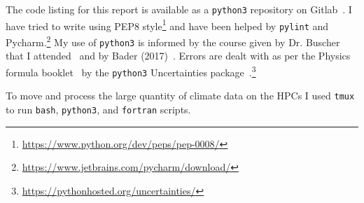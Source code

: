 \documentclass[../main.tex]{subfiles}
\begin{document}
The code listing for this report is available as a \texttt{python3} repository on Gitlab~\cite{gitlab}.
I have tried to write using PEP8 style\footnote{\href{https://www.python.org/dev/peps/pep-0008/}{https://www.python.org/dev/peps/pep-0008/}}
and have been helped by \texttt{pylint} and Pycharm.\footnote{\href{https://www.jetbrains.com/pycharm/download/}{https://www.jetbrains.com/pycharm/download/}}
My use of \texttt{python3} is informed by the course given by Dr. Buscher that I attended~\cite{SciCompNotes}
and by Bader (2017)~\cite{bader2017python}.
Errors are dealt with as per the Physics formula booklet~\cite{MathsFormulaBooklet}
by the \texttt{python3} Uncertainties package~\cite{lebigot2010uncertainties}.\footnote{\href{https://pythonhosted.org/uncertainties/}{https://pythonhosted.org/uncertainties/}}

 To move and process the large quantity of climate data on the HPCs I used \texttt{tmux}
 to run \texttt{bash}, \texttt{python3}, and \texttt{fortran} scripts.
\end{document}

